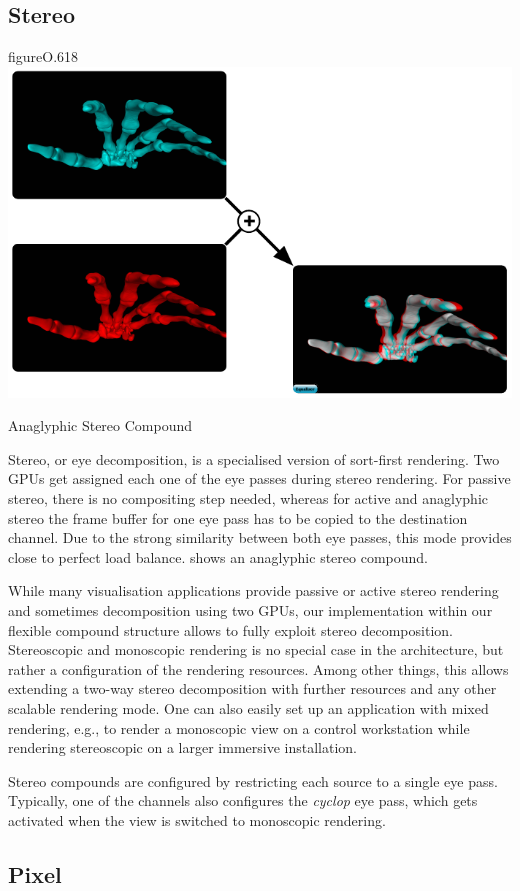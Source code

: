 \subsection{Stereo}

\begin{wrapfloat}{figure}{O}{.618\textwidth}
 \includegraphics[width=.618\textwidth]{images/Stereo}
 {\caption{\label{fStereo}Anaglyphic Stereo Compound}}
\end{wrapfloat}

Stereo, or eye decomposition, is a specialised version of sort-first rendering.
Two GPUs get assigned each one of the eye passes during stereo rendering. For
passive stereo, there is no compositing step needed, whereas for active and
anaglyphic stereo the frame buffer for one eye pass has to be copied to the
destination channel. Due to the strong similarity between both eye passes, this
mode provides close to perfect load balance.  shows an ana\-gly\-phic stereo compound.

While many visualisation applications provide passive or active stereo rendering and
sometimes decomposition using two GPUs, our implementation within our flexible
compound structure allows to fully exploit stereo decomposition.  Stereoscopic
and monoscopic rendering is no special case in the architecture, but rather a
configuration of the rendering resources. Among other things, this allows
extending a two-way stereo decomposition with further resources and any other
scalable rendering mode. One can also easily set up an application with mixed
rendering, e.g., to render a monoscopic view on a control workstation while
rendering stereoscopic on a larger immersive installation.

Stereo compounds are configured by restricting each source to a single eye
pass. Typically, one of the channels also configures the {\em cyclop} eye
pass, which gets activated when the view is switched to monoscopic rendering.


\subsection{Pixel}

